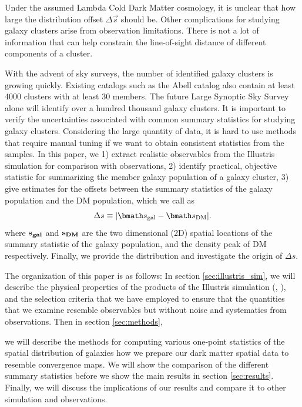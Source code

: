 Under the assumed Lambda Cold Dark Matter cosmology, it is unclear 
that how large the distribution offset $\Delta \vec{s}$ should be. 
Other complications for studying galaxy clusters arise from observation
limitations. There is not a lot of information that can help constrain the  
line-of-sight distance of different components of a cluster. 


With the advent of sky surveys, 
the number of identified galaxy clusters is growing quickly. 
Existing catalogs such as the Abell catalog also contain
at least 4000 clusters with at least 30 members. 
The future Large Synoptic Sky Survey alone will identify over a hundred thousand galaxy
clusters. It is important to verify the uncertainties associated with common
summary statistics for studying galaxy clusters. Considering the large quantity
of data, it is hard to use methods that require manual tuning if we want to
obtain consistent statistics from the samples.
In this paper, we 
1) extract realistic observables from the Illustris simulation for
comparison with observations, 2) identify practical, objective statistic for 
summarizing the member galaxy population of a galaxy cluster, 3)	
give estimates for the offsets between the summary statistics of the galaxy  
population and the DM population, which we call as 
\begin{equation}
	\Delta s \equiv |\vec{s}_{\rm gal} - \vec{s}_{\rm DM}|.
\end{equation}
where $\bf{s}_{gal}$ and $\bf{s}_{DM}$ are the two dimensional (2D) spatial
locations of the summary statistic of the galaxy population, and the density
peak of DM respectively. 
Finally, we provide the distribution and investigate the origin of $\Delta s$. 

The organization of this paper is as follows:
In section \ref{sec:illustris_sim},
we will describe the physical properties of the products of the Illustris
simulation (\citealt{Vogelsberger2014}, \citealt{Genel2014a}), 
and the selection criteria that we have employed to ensure that the
quantities that we examine resemble observables but without noise and
systematics from observations. Then in section \ref{sec:methods}, 

we will describe the methods for computing various 
one-point statistics of the spatial distribution of galaxies how we prepare our dark
matter spatial data to resemble convergence maps. We will show the comparison
of the different summary statistics before we show the main results
in section \ref{sec:results}. Finally, we will discuss the implications of our
results and compare it to other simulation and observations.



